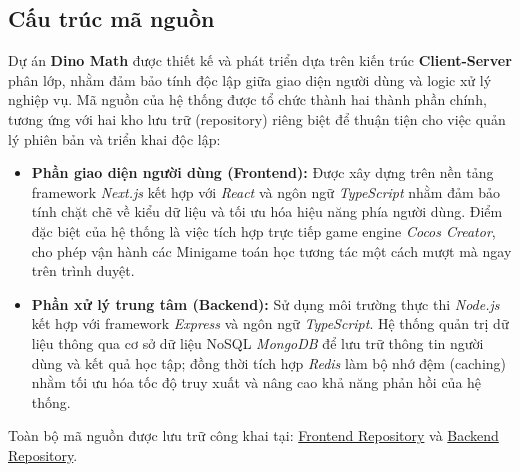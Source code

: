 
\subsection{Cấu trúc mã nguồn}
\label{sec:tong-quan-ma-nguon}

Dự án \textbf{Dino Math} được thiết kế và phát triển dựa trên kiến trúc \textbf{Client-Server} phân lớp, nhằm đảm bảo tính độc lập giữa giao diện người dùng và logic xử lý nghiệp vụ. Mã nguồn của hệ thống được tổ chức thành hai thành phần chính, tương ứng với hai kho lưu trữ (repository) riêng biệt để thuận tiện cho việc quản lý phiên bản và triển khai độc lập:

\begin{itemize}
	\item \textbf{Phần giao diện người dùng (Frontend):} 
	Được xây dựng trên nền tảng framework \textit{Next.js} kết hợp với \textit{React} và ngôn ngữ \textit{TypeScript} nhằm đảm bảo tính chặt chẽ về kiểu dữ liệu và tối ưu hóa hiệu năng phía người dùng. Điểm đặc biệt của hệ thống là việc tích hợp trực tiếp game engine \textit{Cocos Creator}, cho phép vận hành các Minigame toán học tương tác một cách mượt mà ngay trên trình duyệt.
	
	\item \textbf{Phần xử lý trung tâm (Backend):} 
	Sử dụng môi trường thực thi \textit{Node.js} kết hợp với framework \textit{Express} và ngôn ngữ \textit{TypeScript}. Hệ thống quản trị dữ liệu thông qua cơ sở dữ liệu NoSQL \textit{MongoDB} để lưu trữ thông tin người dùng và kết quả học tập; đồng thời tích hợp \textit{Redis} làm bộ nhớ đệm (caching) nhằm tối ưu hóa tốc độ truy xuất và nâng cao khả năng phản hồi của hệ thống.
\end{itemize}

Toàn bộ mã nguồn được lưu trữ công khai tại: \href{https://github.com/coldwind444/dino-fe.git}{Frontend Repository} và \href{https://github.com/boyastro/dino_math_backend.git}{Backend Repository}.

